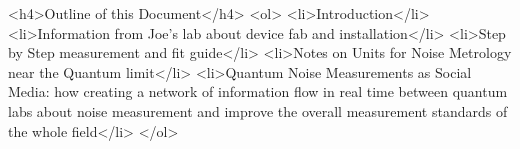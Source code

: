 \documentclass[11pt]{article}
\begin{document}
<h4>Outline of this Document</h4>
<ol>
    <li>Introduction</li>
    <li>Information from Joe's lab about device fab and installation</li>
    <li>Step by Step measurement and fit guide</li>
    <li>Notes on Units for Noise Metrology near the Quantum limit</li>
    <li>Quantum Noise Measurements as Social Media: how creating a network of information flow in real time between quantum labs about noise measurement and improve the overall measurement standards of the whole field</li>
</ol>
\end{document}
